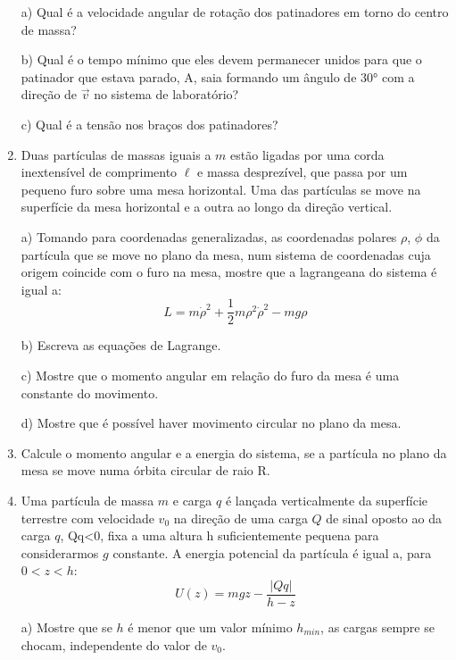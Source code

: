 \begin{enumerate}[start=1,label={\bfseries Q\arabic*.}]
a) Qual é a velocidade angular de rotação dos patinadores em torno do centro de massa?

\resposta

b) Qual é o tempo mínimo que eles devem permanecer unidos para que o patinador que estava parado, A, saia formando um ângulo de $30°$ com a direção de $\vec{v}$ no sistema de laboratório?

\resposta

c) Qual é a tensão nos braços dos patinadores?

\resposta


\item Duas partículas de massas iguais a $m$ estão ligadas por uma corda inextensível de comprimento $\ell$ e massa desprezível, que passa por um pequeno furo sobre uma mesa horizontal. Uma das partículas se move na superfície da mesa horizontal e a outra ao longo da direção vertical.

a) Tomando para coordenadas generalizadas, as coordenadas polares $\rho$, $\phi$ da partícula que se move no plano da mesa, num sistema de coordenadas cuja origem coincide com o furo na mesa, mostre que a lagrangeana do sistema é igual a:
$$
L = m\dot{\rho}^{2} + \frac{1}{2} m \rho^{2} \dot{\rho}^{2} - mg\rho
$$

\resposta

b) Escreva as equações de Lagrange.

\resposta

c) Mostre que o momento angular em relação do furo da mesa é uma constante do movimento.

\resposta

d) Mostre que é possível haver movimento circular no plano da mesa.
\item[] Calcule o momento angular e a energia do sistema, se a partícula no plano da mesa se move numa órbita circular de raio R.

\resposta


\item Uma partícula de massa $m$ e carga $q$ é lançada verticalmente da superfície terrestre com velocidade $v_{0}$ na direção de uma carga $Q$ de sinal oposto ao da carga $q$, Qq<0, fixa a uma altura h suficientemente pequena para considerarmos $g$ constante. A energia potencial da partícula é igual a, para $0 < z < h$:
$$
U(z) = mgz - \frac{|Qq|}{h-z}
$$

a) Mostre que se $h$ é menor que um valor mínimo $h_{min}$, as cargas sempre se chocam, independente do valor de $v_{0}$.


\end{enumerate}
